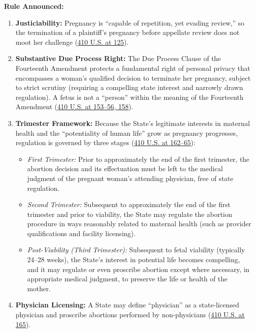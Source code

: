 \documentclass[12pt]{article}
\begin{document}
\textbf{Rule Announced:}
\begin{enumerate}
\item \textbf{Justiciability:} Pregnancy is ``capable of repetition, yet evading review,'' so the termination of a plaintiff's pregnancy before appellate review does not moot her challenge (\href{https://supreme.justia.com/cases/federal/us/410/113/}{410 U.S. at 125}).
\item \textbf{Substantive Due Process Right:} The Due Process Clause of the Fourteenth Amendment protects a fundamental right of personal privacy that encompasses a woman's qualified decision to terminate her pregnancy, subject to strict scrutiny (requiring a compelling state interest and narrowly drawn regulation). A fetus is not a ``person'' within the meaning of the Fourteenth Amendment (\href{https://supreme.justia.com/cases/federal/us/410/113/}{410 U.S. at 153--56, 158}).
\item \textbf{Trimester Framework:} Because the State's legitimate interests in maternal health and the ``potentiality of human life'' grow as pregnancy progresses, regulation is governed by three stages (\href{https://supreme.justia.com/cases/federal/us/410/113/}{410 U.S. at 162--65}):
  \begin{itemize}
  \item \textit{First Trimester:} Prior to approximately the end of the first trimester, the abortion decision and its effectuation must be left to the medical judgment of the pregnant woman's attending physician, free of state regulation.
  \item \textit{Second Trimester:} Subsequent to approximately the end of the first trimester and prior to viability, the State may regulate the abortion procedure in ways reasonably related to maternal health (such as provider qualifications and facility licensing).
  \item \textit{Post-Viability (Third Trimester):} Subsequent to fetal viability (typically 24--28 weeks), the State's interest in potential life becomes compelling, and it may regulate or even proscribe abortion except where necessary, in appropriate medical judgment, to preserve the life or health of the mother.
  \end{itemize}
\item \textbf{Physician Licensing:} A State may define ``physician'' as a state-licensed physician and proscribe abortions performed by non-physicians (\href{https://supreme.justia.com/cases/federal/us/410/113/}{410 U.S. at 165}).
\end{enumerate}
\end{document}
